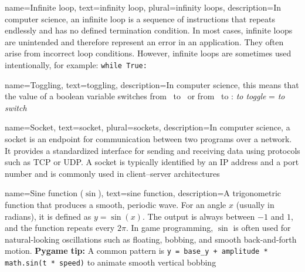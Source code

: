{
	name={Infinite loop},
	text={infinity loop},
	plural={infinity loops},
	description={In computer science, an infinite loop is a sequence of instructions that repeats endlessly and has no defined termination condition. In most cases, infinite loops are unintended and therefore represent an error in an application. They often arise from incorrect loop conditions. However, infinite loops are sometimes used intentionally, for example: \texttt{while True:}} 
}

{
	name={Toggling},
	text={toggling},
	description={In computer science, this means that the value of a boolean variable switches from \true\ to \false\ or from \false\ to \true: \emph{to toggle} = \emph{to switch}} 
}

{
	name={Socket},
	text={socket},
	plural={sockets},
	description={In computer science, a socket is an endpoint for communication between two programs over a network. It provides a standardized interface for sending and receiving data using protocols such as TCP or UDP. A socket is typically identified by an IP address and a port number and is commonly used in client--server architectures}
}


%

{
	name={Sine function (\(\sin\))},
	text={sine function},
	description={A trigonometric function that produces a smooth, periodic wave. For an angle \(x\) (usually in radians), it is defined as \(y=\sin(x)\). The output is always between \(-1\) and \(1\), and the function repeats every \(2\pi\). In game programming, \(\sin\) is often used for natural-looking oscillations such as floating, bobbing, and smooth back-and-forth motion. \textbf{Pygame tip:} A common pattern is \texttt{y = base\_y + amplitude * math.sin(t * speed)} to animate smooth vertical bobbing}
}

